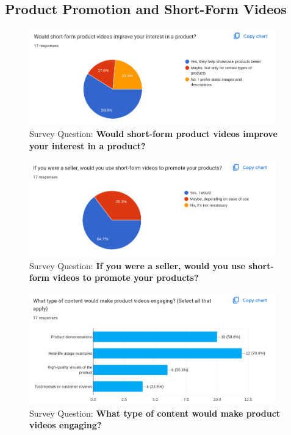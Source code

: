 \documentclass[12pt]{report}
\begin{document}
\begin{appendices}
	\section{Product Promotion and Short-Form Videos}

	\begin{figure}[H]
		\begin{center}
			\includegraphics[width=0.95\textwidth]{survey/q9}
		\end{center}
		\caption{Survey Question: \textbf{Would short-form product videos improve your interest in a product?}}
	\end{figure}

	\begin{figure}[H]
		\begin{center}
			\includegraphics[width=0.95\textwidth]{survey/q10}
		\end{center}
		\caption{Survey Question: \textbf{If you were a seller, would you use short-form videos to promote your products?}}
	\end{figure}

	\begin{figure}[H]
		\begin{center}
			\includegraphics[width=0.95\textwidth]{survey/q11}
		\end{center}
		\caption{Survey Question: \textbf{What type of content would make product videos engaging? }}
	\end{figure}


\end{appendices}
\end{document}
